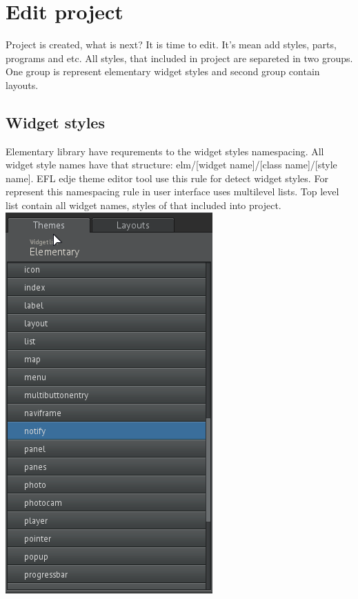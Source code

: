 \documentclass[titlepage,oneside,11pt]{book}
\begin{document}
\section{Edit project}
Project is created, what is next? It is time to edit. It's mean add styles, parts, programs and etc.\newline
All styles, that included in project are separeted in two groups. One group is represent elementary widget styles and second group contain layouts.
\subsection{Widget styles}
Elementary library have requrements to the widget styles namespacing. All widget style names have that structure: elm/[widget name]/[class name]/[style name]. EFL edje theme editor tool use this rule for detect widget styles. For represent this namespacing rule in user interface uses multilevel lists. Top level list contain all widget names, styles of that included into project.\newline
\includegraphics[scale=0.5]{images/widget_list.png}
\end{document}
